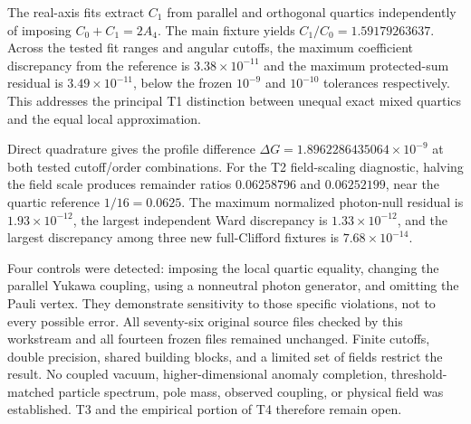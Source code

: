 The real-axis fits extract $C_1$ from parallel and orthogonal quartics independently of imposing $C_0+C_1=2A_4$. The main fixture yields $C_1/C_0=1.59179263637$. Across the tested fit ranges and angular cutoffs, the maximum coefficient discrepancy from the reference is $3.38\times10^{-11}$ and the maximum protected-sum residual is $3.49\times10^{-11}$, below the frozen $10^{-9}$ and $10^{-10}$ tolerances respectively. This addresses the principal T1 distinction between unequal exact mixed quartics and the equal local approximation.

Direct quadrature gives the profile difference $\Delta G=1.8962286435064\times10^{-9}$ at both tested cutoff/order combinations. For the T2 field-scaling diagnostic, halving the field scale produces remainder ratios $0.06258796$ and $0.06252199$, near the quartic reference $1/16=0.0625$. The maximum normalized photon-null residual is $1.93\times10^{-12}$, the largest independent Ward discrepancy is $1.33\times10^{-12}$, and the largest discrepancy among three new full-Clifford fixtures is $7.68\times10^{-14}$.

Four controls were detected: imposing the local quartic equality, changing the parallel Yukawa coupling, using a nonneutral photon generator, and omitting the Pauli vertex. They demonstrate sensitivity to those specific violations, not to every possible error. All seventy-six original source files checked by this workstream and all fourteen frozen files remained unchanged. Finite cutoffs, double precision, shared building blocks, and a limited set of fields restrict the result. No coupled vacuum, higher-dimensional anomaly completion, threshold-matched particle spectrum, pole mass, observed coupling, or physical field was established. T3 and the empirical portion of T4 therefore remain open.

